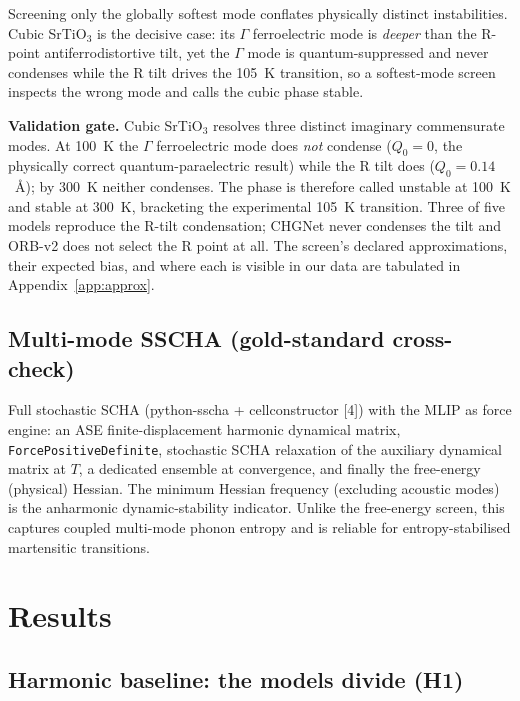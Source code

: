 \documentclass{article}
\begin{document}
Screening only the globally softest mode conflates physically distinct instabilities. Cubic SrTiO$_3$ is the decisive case: its $\Gamma$ ferroelectric mode is \emph{deeper} than the R-point antiferrodistortive tilt, yet the $\Gamma$ mode is quantum-suppressed and never condenses while the R tilt drives the 105~K transition, so a softest-mode screen inspects the wrong mode and calls the cubic phase stable.

\textbf{Validation gate.} Cubic SrTiO$_3$ resolves three distinct imaginary commensurate modes. At 100~K the $\Gamma$ ferroelectric mode does \emph{not} condense ($Q_0=0$, the physically correct quantum-paraelectric result) while the R tilt does ($Q_0=0.14$~\AA); by 300~K neither condenses. The phase is therefore called unstable at 100~K and stable at 300~K, bracketing the experimental 105~K transition. Three of five models reproduce the R-tilt condensation; CHGNet never condenses the tilt and ORB-v2 does not select the R point at all. The screen's declared approximations, their expected bias, and where each is visible in our data are tabulated in Appendix~\ref{app:approx}.

\subsection{Multi-mode SSCHA (gold-standard cross-check)}
\label{sec:sscha-method}

Full stochastic SCHA (python-sscha + cellconstructor [4]) with the MLIP as force engine: an ASE finite-displacement harmonic dynamical matrix, \texttt{ForcePositiveDefinite}, stochastic SCHA relaxation of the auxiliary dynamical matrix at $T$, a dedicated ensemble at convergence, and finally the free-energy (physical) Hessian. The minimum Hessian frequency (excluding acoustic modes) is the anharmonic dynamic-stability indicator. Unlike the free-energy screen, this captures coupled multi-mode phonon entropy and is reliable for entropy-stabilised martensitic transitions.

\section{Results}
\label{sec:results}

\subsection{Harmonic baseline: the models divide (H1)}
\label{sec:h1}
\end{document}
